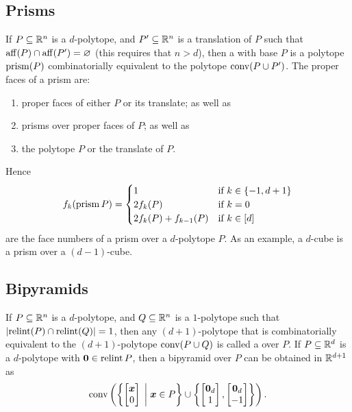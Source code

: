     \subsection{Prisms}
        If \(P\subseteq\mathbb{R}^{n}\) is a \(d\)-polytope, and \(P'\subseteq\mathbb{R}^{n}\) is a translation of \(P\) such that \(\operatorname{aff}(P)\cap\operatorname{aff}(P')=\varnothing\) (this requires that \(n>d\)), then a  with base \(P\) is a polytope \(\operatorname{prism}(P)\) combinatorially equivalent to the polytope \(\operatorname{conv}(P\cup P')\).  The proper faces of a prism are:
            \begin{enumerate}
                \item   proper faces of either \(P\) or its translate; as well as
                \item   prisms over proper faces of \(P\); as well as
                \item   the polytope \(P\) or the translate of \(P\).
            \end{enumerate}
        Hence
            \[
                f_k(\operatorname{prism} P)
                    =   \begin{cases}
                            1                           &   \text{if }k\in\left\{-1,d+1\right\}\\
                            2f_k(P)                     &   \text{if }k=0\\
                            2f_k(P)+f_{k-1}(P)          &   \text{if }k\in\left[d\right]
                        \end{cases}
            \]
        are the face numbers of a prism over a \(d\)-polytope \(P\).  As an example, a \(d\)-cube is a prism over a \((d-1)\)-cube.
    \subsection{Bipyramids}
        If \(P\subseteq\mathbb{R}^{n}\) is a \(d\)-polytope, and \(Q\subseteq\mathbb{R}^{n}\) is a \(1\)-polytope such that \(\left\lvert\operatorname{relint}(P)\cap\operatorname{relint}(Q)\right\rvert=1\), then any \((d+1)\)-polytope that is combinatorially equivalent to the \((d+1)\)-polytope \(\operatorname{conv}(P\cup Q)\) is called a  over \(P\).  If \(P\subseteq\mathbb{R}^{d}\) is a \(d\)-polytope with \(\bm{0}\in\operatorname{relint} P\), then a bipyramid over \(P\) can be obtained in \(\mathbb{R}^{d+1}\) as
            \[
                \conv\left(\setb{\begin{bmatrix}\ve x\\ 0\end{bmatrix}}{\ve x\in P}\cup\seta{\begin{bmatrix}\ve 0_d\\ 1\end{bmatrix},\begin{bmatrix}\ve 0_d\\ -1\end{bmatrix}}\right).
            \]

